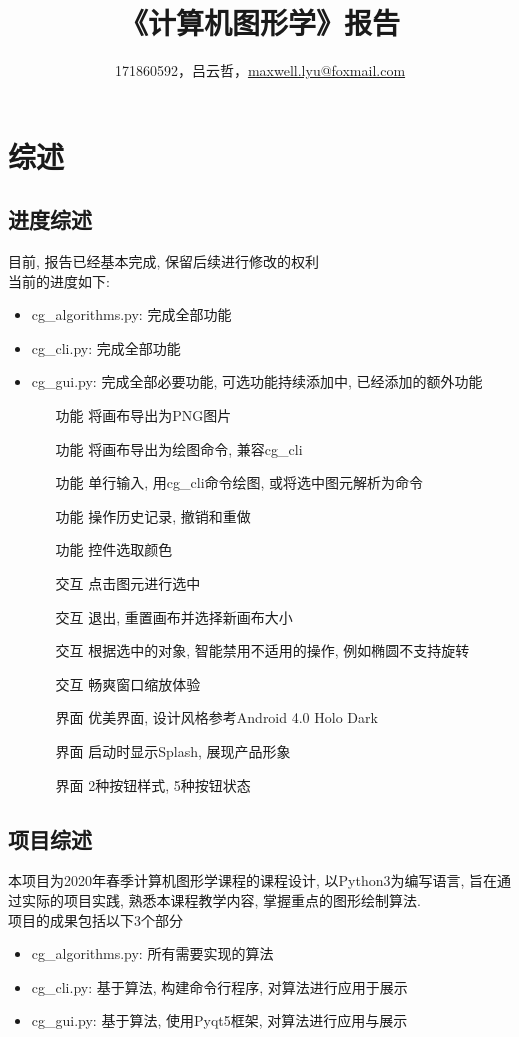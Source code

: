 \documentclass[a4paper,UTF8]{article}
\theoremstyle{definition}
\begin{document}
\title{\textbf{《计算机图形学》报告}}
\author{171860592，吕云哲，\href{mailto:maxwell.lyu@foxmail.com}{maxwell.lyu@foxmail.com}}
\maketitle

\tableofcontents
\newpage

\section{综述}
\subsection{进度综述}
  目前, 报告已经基本完成, 保留后续进行修改的权利\\
  当前的进度如下: 
  \begin{itemize}
    \item cg\_algorithms.py: 完成全部功能
    \item cg\_cli.py: 完成全部功能
    \item cg\_gui.py: 完成全部必要功能, 可选功能持续添加中, 已经添加的额外功能
    \begin{itemize}
      \item [功能]将画布导出为PNG图片
      \item [功能]将画布导出为绘图命令, 兼容cg\_cli
      \item [功能]单行输入, 用cg\_cli命令绘图, 或将选中图元解析为命令
      \item [功能]操作历史记录, 撤销和重做
      \item [功能]控件选取颜色
      \item [交互]点击图元进行选中
      \item [交互]退出, 重置画布并选择新画布大小
      \item [交互]根据选中的对象, 智能禁用不适用的操作, 例如椭圆不支持旋转
      \item [交互]畅爽窗口缩放体验
      \item [界面]优美界面, 设计风格参考Android 4.0 Holo Dark
      \item [界面]启动时显示Splash, 展现产品形象
      \item [界面]2种按钮样式, 5种按钮状态
    \end{itemize}
  \end{itemize}
\subsection{项目综述}
  本项目为2020年春季计算机图形学课程的课程设计, 以Python3为编写语言, 旨在通过实际的项目实践, 熟悉本课程教学内容, 掌握重点的图形绘制算法.\\
  项目的成果包括以下3个部分
  \begin{itemize}
    \item cg\_algorithms.py: 所有需要实现的算法
    \item cg\_cli.py: 基于算法, 构建命令行程序, 对算法进行应用于展示
    \item cg\_gui.py: 基于算法, 使用Pyqt5框架, 对算法进行应用与展示
  \end{itemize}
\end{document}
